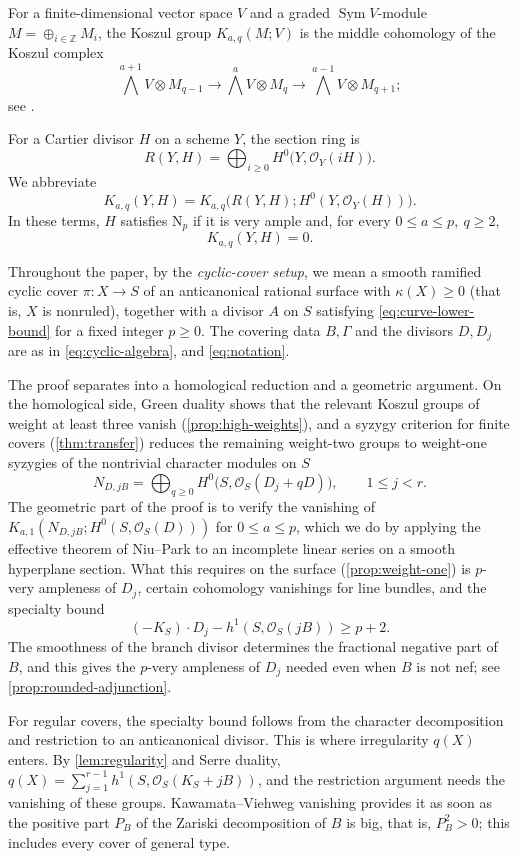 \documentclass[11pt,reqno]{amsart}
\numberwithin{equation}{section}
\theoremstyle{remark}
\newcommand{\sshf}[1]{\mathcal{O}_{#1}}
\newcommand{\paren}[1]{\left(#1\right)}
\newcommand{\Sym}{\operatorname{Sym}}
\newcommand{\NP}{\mathrm N}
\begin{document}
For a finite-dimensional vector space \(V\) and a graded
\(\Sym V\)-module \(M=\oplus_{i\in\mathbb{Z}} M_i\), the Koszul group \(K_{a,q}(M;V)\) is the middle cohomology
of the Koszul complex
\[
 \bigwedge^{a+1}V\otimes M_{q-1}\longrightarrow
 \bigwedge^aV\otimes M_q\longrightarrow
 \bigwedge^{a-1}V\otimes M_{q+1};
\]
see \cite[Sections~1.2--1.4]{AproduNagel}.

For a Cartier divisor \(H\) on a scheme \(Y\), the section ring is
\[
R(Y,H)=\bigoplus_{i\geq0}H^0\bigl(Y,\sshf{Y}(iH)\bigr).
\]
We abbreviate
\[
 K_{a,q}(Y,H)=
 K_{a,q}\bigl(R(Y,H);H^0(Y,\sshf{Y}(H))\bigr).
\]
In these terms, \(H\) satisfies \(\NP_p\) if it is very ample and, for every \(0\leq a\leq p,\ q\geq2\),
\[
 K_{a,q}(Y,H)=0.
\]

Throughout the paper, by the \emph{cyclic-cover setup}, we mean a smooth ramified cyclic cover $\pi: X\rightarrow S$ of an anticanonical rational surface with $\kappa(X)\ge 0$ (that is, $X$ is nonruled), together with a divisor $A$ on $S$ satisfying \eqref{eq:curve-lower-bound} for a fixed integer $p\ge 0$. The covering data $B, \Gamma$ and the divisors $D, D_j$ are as in
\eqref{eq:cyclic-algebra}, and \eqref{eq:notation}.


The proof separates into a homological reduction and a geometric argument. On the homological side, Green duality shows that the relevant Koszul groups of weight at least three vanish (\cref{prop:high-weights}), and a syzygy criterion for finite covers (\cref{thm:transfer}) reduces the remaining weight-two groups to weight-one syzygies of the nontrivial character modules on $S$
\[
 N_{D,jB}=\bigoplus_{q\geq0}
 H^0\bigl(S,\sshf{S}(D_j+qD)\bigr),\qquad 1\leq j<r.
\]
The geometric part of the proof is to verify the vanishing of $K_{a, 1}\paren{N_{D,jB}; H^0(S, \sshf{S}(D))}$ for $0\le a\le p$, which we do by applying the effective theorem of Niu--Park \cite{NiuPark} to an incomplete linear series on a smooth hyperplane section. What this requires on the surface (\cref{prop:weight-one}) is $p$-very ampleness of \(D_j\), certain cohomology vanishings for line bundles, and the specialty bound
\[
 (-K_S)\cdot D_j-h^1(S,\sshf{S}(jB))\geq p+2.
\]
The smoothness of the branch divisor determines the fractional negative part
of \(B\), and this gives the $p$-very ampleness of $D_j$ needed even when
\(B\) is not nef; see \cref{prop:rounded-adjunction}.

For regular covers, the specialty bound follows from the character decomposition and restriction to an anticanonical divisor. This is where irregularity \(q(X)\) enters. By \cref{lem:regularity} and Serre duality, \(q(X)=\sum_{j=1}^{r-1}h^1(S,\sshf{S}(K_S+jB))\), and the restriction argument needs the vanishing of these groups. Kawamata--Viehweg vanishing provides it as soon as the positive part \(P_B\) of the Zariski decomposition of \(B\) is big, that is, \(P_B^2>0\); this includes every cover of general type.
\end{document}
